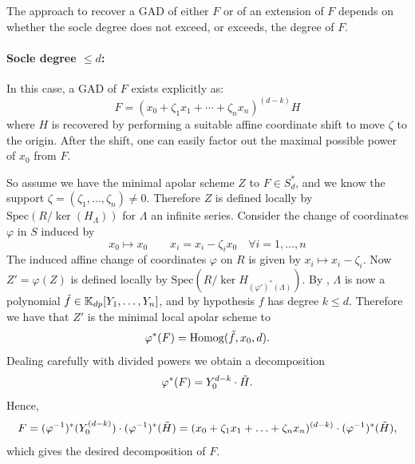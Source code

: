 \documentclass[a4paper,11p]{amsart}
\newcommand{\K}{\mathbb K}
\begin{document}
The approach to recover a GAD of either $F$ or of an extension of $F$  depends on whether the socle degree does not exceed, or exceeds, the degree of $F$.


\medskip

\paragraph{\textbf{Socle degree $\leq  d$:}}  In this case, a GAD of $F$ exists explicitly as:
\[F=(x_0+\zeta_1x_1+\cdots+\zeta_nx_n)^{(d-k)}H\]
where $H$ is recovered by performing a suitable affine coordinate shift to move $\zeta$ to the origin. After the shift, one can easily factor out the maximal possible power of $x_0$ from $F$.

%
%
So assume we have the minimal apolar scheme $Z$ to $F\in S_d^*$, and we know the support $\zeta=(\zeta_1,\ldots,\zeta_n)\neq 0$. Therefore $Z$ is defined locally by $\text{Spec}(R/\ker(H_\Lambda))$ for $\Lambda$ an infinite series. Consider the change of coordinates $\varphi$ in $S$ induced by 
\[x_0\mapsto x_0 \quad \quad x_i=x_i-\zeta_ix_0 \quad \forall i=1,\ldots, n\]
The induced affine change of coordinates $\varphi$ on $R$ is given by $x_i\mapsto x_i-\zeta_i$. Now $Z'=\varphi(Z)$ is defined locally by $\text{Spec}\left(R/\ker H_{(\varphi')^*(\Lambda)}\right)$. By , $\Lambda$ is now a polynomial $\Tilde{f}\in \K_{dp}[Y_1,\ldots, Y_n]$, and by hypothesis $f$ has degree $k\leq d$. Therefore we have that $Z'$ is the minimal local apolar scheme to
\[\varphi^*(F)= \operatorname{Homog}(\Tilde{f},x_0, d).\]
Dealing carefully with divided powers we obtain a decomposition 
\[\varphi^*(F)=Y_0^{d-k}\cdot \Tilde{H}.\]
Hence,
\[F=(\varphi^{-1})^*(Y_0^{(d-k)})\cdot (\varphi^{-1})^*(\Tilde{H})=
(x_0+\zeta_1x_1+\ldots+\zeta_nx_n)^{(d-k)}\cdot (\varphi^{-1})^*(\Tilde{H}),\]
which gives the desired decomposition of $F$.
\end{document}
